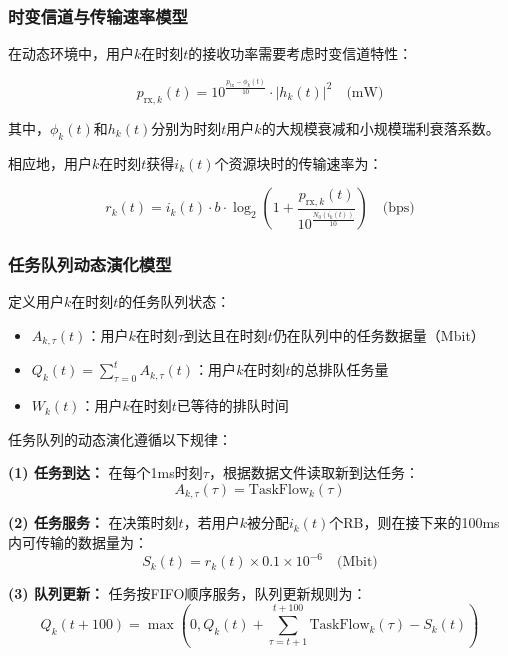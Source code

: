 \subsubsection{时变信道与传输速率模型}

在动态环境中，用户$k$在时刻$t$的接收功率需要考虑时变信道特性：

\begin{equation}
p_{\text{rx},k}(t) = 10^{\frac{p_{\text{tx}} - \phi_k(t)}{10}} \cdot |h_k(t)|^2 \quad \text{(mW)}
\end{equation}

其中，$\phi_k(t)$和$h_k(t)$分别为时刻$t$用户$k$的大规模衰减和小规模瑞利衰落系数。

相应地，用户$k$在时刻$t$获得$i_k(t)$个资源块时的传输速率为：

\begin{equation}
r_k(t) = i_k(t) \cdot b \cdot \log_2\left(1 + \frac{p_{\text{rx},k}(t)}{10^{\frac{N_0(i_k(t))}{10}}}\right) \quad \text{(bps)}
\end{equation}

\subsubsection{任务队列动态演化模型}

定义用户$k$在时刻$t$的任务队列状态：

\begin{itemize}
  \item $A_{k,\tau}(t)$：用户$k$在时刻$\tau$到达且在时刻$t$仍在队列中的任务数据量（Mbit）
  \item $Q_k(t) = \sum_{\tau=0}^{t} A_{k,\tau}(t)$：用户$k$在时刻$t$的总排队任务量
  \item $W_k(t)$：用户$k$在时刻$t$已等待的排队时间
\end{itemize}

任务队列的动态演化遵循以下规律：

\textbf{(1) 任务到达：}
在每个1ms时刻$\tau$，根据数据文件读取新到达任务：
\begin{equation}
A_{k,\tau}(\tau) = \text{TaskFlow}_k(\tau)
\end{equation}

\textbf{(2) 任务服务：}
在决策时刻$t$，若用户$k$被分配$i_k(t)$个RB，则在接下来的100ms内可传输的数据量为：
\begin{equation}
S_k(t) = r_k(t) \times 0.1 \times 10^{-6} \quad \text{(Mbit)}
\end{equation}

\textbf{(3) 队列更新：}
任务按FIFO顺序服务，队列更新规则为：
\begin{equation}
Q_k(t+100) = \max\left(0, Q_k(t) + \sum_{\tau=t+1}^{t+100} \text{TaskFlow}_k(\tau) - S_k(t)\right)
\end{equation}


